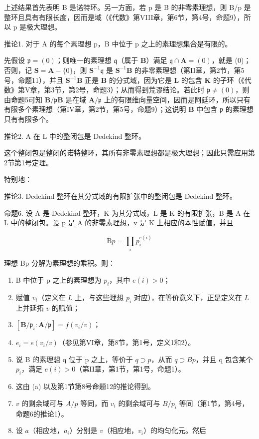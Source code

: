 上述结果首先表明 B 是诺特环。另一方面，若 p 是 B 的非零素理想，则 B/p 是整环且具有有限长度，因而是域（《代数》第VIII章，第6节，第4号，命题9），所以 p 是极大理想。

推论1. 对于 A 的每个素理想 p，B 中位于 p 之上的素理想集合是有限的。

先假设 \(\mathfrak{p} = (0)\)；则唯一的素理想 \(\mathfrak{q}\)（属于 \(\mathbf{B}\)）满足 \(\mathfrak{q} \cap \mathbf{A} = (0)\)，就是 (0)；否则，记 \(\mathbf{S} = \mathbf{A} - \{0\}\)，则 \(\mathbf{S}^{-1}\mathfrak{q}\) 是 \(\mathbf{S}^{-1}\mathbf{B}\) 的非零素理想（第II章，第2节，第5号，命题11），并且 \(\mathbf{S}^{-1}\mathbf{B}\) 正是 \(\mathbf{B}\) 的分式域，因为它是 \(\mathbf{L}\) 的包含 \(\mathbf{K}\) 的子环（《代数》第V章，第3节，第2号，命题3）；从而得到荒谬结论。若此时 \(\mathfrak{p} \neq (0)\)，则由命题5可知 \(\mathbf{B}/\mathfrak{p}\mathbf{B}\) 是在域 \(\mathbf{A}/\mathfrak{p}\) 上的有限维向量空间，因而是阿廷环，所以只有有限多个素理想（第IV章，第2节，第5号，命题9）；这说明 \(\mathbf{B}\) 中包含 \(\mathfrak{p}\) 的素理想只有有限多个。

推论2. A 在 L 中的整闭包是 Dedekind 整环。

这个整闭包是整闭的诺特整环，其所有非零素理想都是极大理想；因此只需应用第2节第1号定理。

特别地：

推论3. Dedekind 整环在其分式域的有限扩张中的整闭包是 Dedekind 整环。

命题6. 设 A 是 Dedekind 整环，K 为其分式域，L 是 K 的有限扩张，B 是 A 在 L 中的整闭包。设 p 是 A 的非零素理想，v 是 K 上相应的本性赋值，并且

\[
\mathrm{B} p = \prod_ {i} p _ {i} ^ {e (i)}
\]

理想 Bp 分解为素理想的乘积。则：

\begin{enumerate}
\def\labelenumi{(\alph{enumi})}
\item
  B 中位于 p 之上的素理想为 \(p_{i}\)，其中 \(e(i) > 0\)；
\item
  赋值 \(v_{i}\)（定义在 \(L\) 上，与这些理想 \(p_{i}\) 对应），在等价意义下，正是定义在 \(L\) 上并延拓 \(v\) 的赋值；
\item
  \([\mathbf{B} / \mathfrak{p}_i\colon \mathbf{A} / \mathfrak{p}] = f(v_i / v)\)；
\item
  \(e_i = e(v_i / v)\)（参见第VI章，第8节，第1号，定义1和2）。
\item
  说 B 的素理想 q 位于 p 之上，等价于 \(q \supset p\)，从而 \(q \supset Bp\)，并且 q 包含某个 \(p_i\)，满足 \(e(i) > 0\)（第II章，第1节，第1号，命题1）。
\item
  这由 (a) 以及第1节第8号命题12的推论得到。
\item
  \(v\) 的剩余域可与 \(A / p\) 等同，而 \(v_i\) 的剩余域可与 \(B / p_i\) 等同（第1节，第4号，命题6的推论1）。
\item
  设 \(a\)（相应地，\(a_i\)）分别是 \(v\)（相应地，\(v_i\)）的均匀化元。然后
\end{enumerate}

